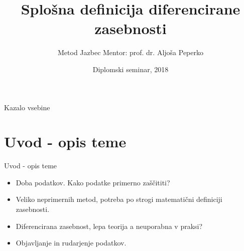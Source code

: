 \documentclass{beamer}
\title[Diferencirana zasebnost] 
{Splošna definicija diferencirane zasebnosti}
\author[Metod Jazbec] 
{Metod Jazbec
\newline
\newline
Mentor: prof. dr. Aljoša Peperko}
\institute[FMF] 
{
  
  Fakulteta za matematiko in fiziko\\
  Univerza v Ljubljani
 }
\date[DS 2018] %
{Diplomski seminar, 2018}
\begin{document}
\begin{frame}
  \titlepage
\end{frame}

\begin{frame}[allowframebreaks]{Kazalo vsebine}
  \tableofcontents
\end{frame}





\section{Uvod - opis teme}


\begin{frame}{Uvod - opis teme}

  \begin{itemize}
  \item Doba podatkov. Kako podatke primerno zaščititi?
  \item Veliko neprimernih metod, potreba po strogi matematični definiciji zasebnosti.
\item Diferencirana zasebnost, lepa teorija a neuporabna v praksi?
 \item Objavljanje in rudarjenje podatkov.
  \end{itemize}
\end{frame}
\end{document}
